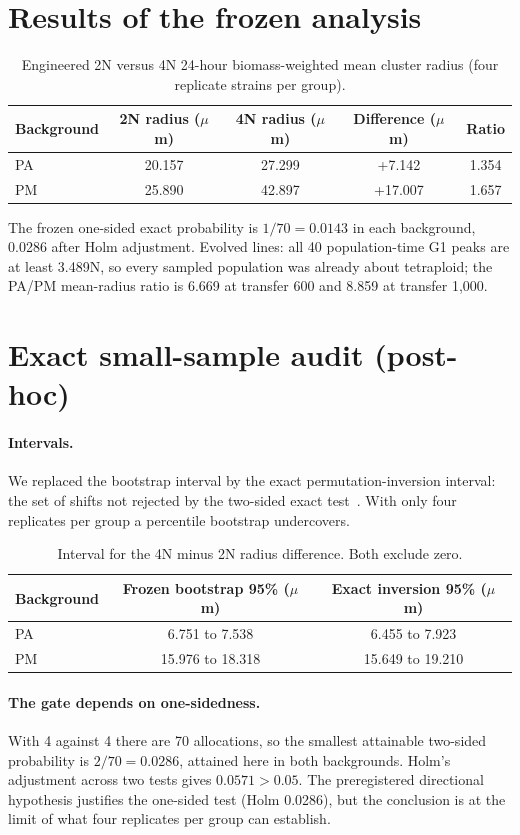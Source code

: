 \documentclass[11pt]{article}
\begin{document}
\section{Results of the frozen analysis}
\begin{table}[h]
\centering\small
\begin{tabular}{lcccc}
\toprule
Background & 2N radius ($\mu$m) & 4N radius ($\mu$m) & Difference ($\mu$m) & Ratio\\
\midrule
PA & 20.157 & 27.299 & +7.142 & 1.354\\
PM & 25.890 & 42.897 & +17.007 & 1.657\\
\bottomrule
\end{tabular}
\caption{Engineered 2N versus 4N 24-hour biomass-weighted mean cluster radius (four replicate strains per group).}
\end{table}
The frozen one-sided exact probability is $1/70=0.0143$ in each background, 0.0286 after Holm adjustment. Evolved lines: all 40
population-time G1 peaks are at least 3.489N, so every sampled population was already about tetraploid; the PA/PM mean-radius ratio is
6.669 at transfer 600 and 8.859 at transfer 1{,}000.

\section{Exact small-sample audit (post-hoc)}
\paragraph{Intervals.}
We replaced the bootstrap interval by the exact permutation-inversion interval: the set of shifts not rejected by the two-sided exact
test~\cite{good2005}. With only four replicates per group a percentile bootstrap undercovers.
\begin{table}[h]
\centering\small
\begin{tabular}{lcc}
\toprule
Background & Frozen bootstrap 95\% ($\mu$m) & Exact inversion 95\% ($\mu$m)\\
\midrule
PA & 6.751 to 7.538 & 6.455 to 7.923\\
PM & 15.976 to 18.318 & 15.649 to 19.210\\
\bottomrule
\end{tabular}
\caption{Interval for the 4N minus 2N radius difference. Both exclude zero.}
\end{table}
\paragraph{The gate depends on one-sidedness.}
With 4 against 4 there are 70 allocations, so the smallest attainable two-sided probability is $2/70=0.0286$, attained here in both
backgrounds. Holm's adjustment across two tests gives $0.0571>0.05$. The preregistered directional hypothesis justifies the one-sided
test (Holm 0.0286), but the conclusion is at the limit of what four replicates per group can establish.
\end{document}
